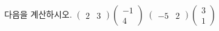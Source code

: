 다음을 계산하시오.
 $\begin{pmatrix} 2 & 3 \end{pmatrix}\begin{pmatrix} -1 \\ 4 \end{pmatrix}$
 $\begin{pmatrix} -5 & 2 \end{pmatrix}\begin{pmatrix} 3 \\ 1 \end{pmatrix}$
